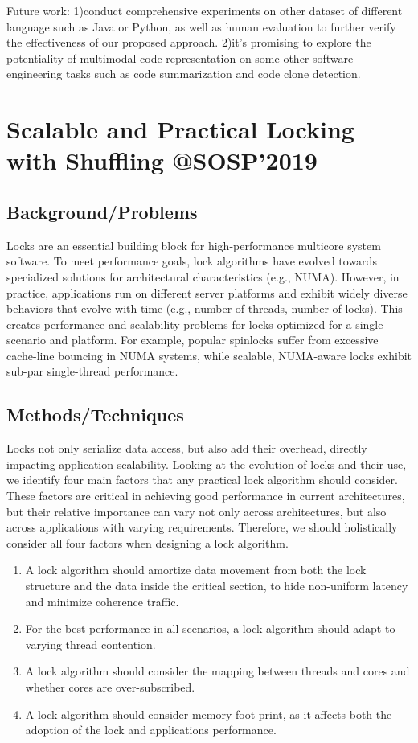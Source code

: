 Future work: 1)conduct comprehensive experiments on other dataset of different language such as Java or Python, as well as human evaluation to further verify the effectiveness of our proposed approach.  2)it’s promising to explore the potentiality of multimodal code representation on some other software engineering tasks such as code summarization and code clone detection.
\newpage
\section{Scalable and Practical Locking with Shuffling @SOSP'2019 }
\subsection{Background/Problems}
Locks are an essential building block for high-performance multicore system software. To meet performance goals, lock algorithms have evolved towards specialized solutions for architectural characteristics (e.g., NUMA). However, in practice, applications run on different server platforms and exhibit widely diverse behaviors that evolve with time (e.g., number of threads, number of locks). This creates performance and scalability problems for locks optimized for a single scenario and platform. For example, popular spinlocks suffer from excessive cache-line bouncing in NUMA systems, while scalable, NUMA-aware locks exhibit sub-par single-thread performance.

\subsection{Methods/Techniques}
Locks not only serialize data access, but also add their overhead, directly impacting application scalability. Looking at the evolution of locks and their use, we identify four main factors that any practical lock algorithm should consider.  These factors are critical in achieving good performance in current architectures, but their relative importance can vary not only across architectures, but also across applications with varying requirements. Therefore, we should holistically consider all four factors when designing a lock algorithm.

\begin{enumerate}
\item A lock algorithm should amortize data movement from both the lock structure and the data inside the critical section, to hide non-uniform latency and minimize coherence traffic.
\item For the best performance in all scenarios, a lock algorithm should adapt to varying thread contention.
\item A lock algorithm should consider the mapping between threads and cores and whether cores are over-subscribed.
\item A lock algorithm should consider memory foot-print, as it affects both the adoption of the lock and applications performance.
\end{enumerate}

